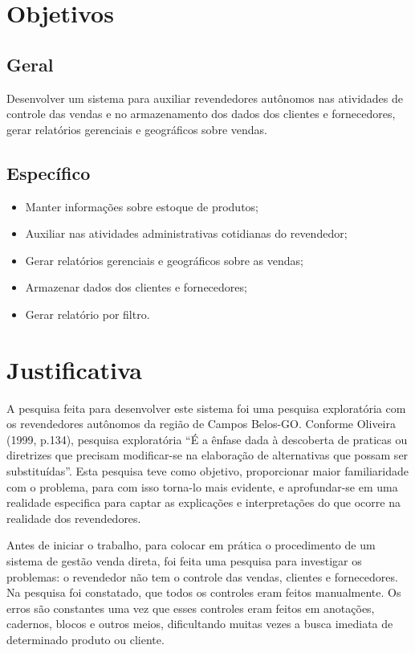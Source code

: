 \documentclass[chapter=TITLE,12pt,oneside,a4paper,english,french,sumario=tradicional,spanish,brazil,]{abntex2}
\begin{document}
\chapter{Objetivos}

\section{Geral}
Desenvolver um sistema para auxiliar revendedores autônomos nas atividades de controle das vendas e no armazenamento dos dados dos clientes e fornecedores, gerar relatórios gerenciais e geográficos sobre vendas.

\section{Específico}
\begin{itemize}
  \item	Manter informações sobre estoque de produtos;
  \item	Auxiliar nas atividades administrativas cotidianas do revendedor;
  \item	Gerar relatórios gerenciais e geográficos sobre as vendas;
  \item	Armazenar dados dos clientes e fornecedores;
  \item	Gerar relatório por filtro.
\end{itemize}


\chapter{Justificativa}
A pesquisa feita para desenvolver este sistema foi uma pesquisa exploratória com os revendedores autônomos da região de Campos Belos-GO. Conforme Oliveira (1999, p.134), pesquisa exploratória “É a ênfase dada à descoberta de praticas ou diretrizes que precisam modificar-se na elaboração de alternativas que possam ser substituídas”. Esta pesquisa teve como objetivo, proporcionar maior familiaridade com o problema, para com isso torna-lo mais evidente, e aprofundar-se em uma realidade especifica para captar as explicações e interpretações do que ocorre na realidade dos revendedores.

Antes de iniciar o trabalho, para colocar em prática o procedimento de um sistema de gestão venda direta, foi feita uma pesquisa para investigar os problemas: o revendedor não tem o controle das vendas, clientes e fornecedores. Na pesquisa foi constatado, que todos os controles eram feitos manualmente. Os erros são constantes uma vez que esses controles eram feitos em anotações, cadernos, blocos e outros meios, dificultando muitas vezes a busca imediata de determinado produto ou cliente.
\end{document}
